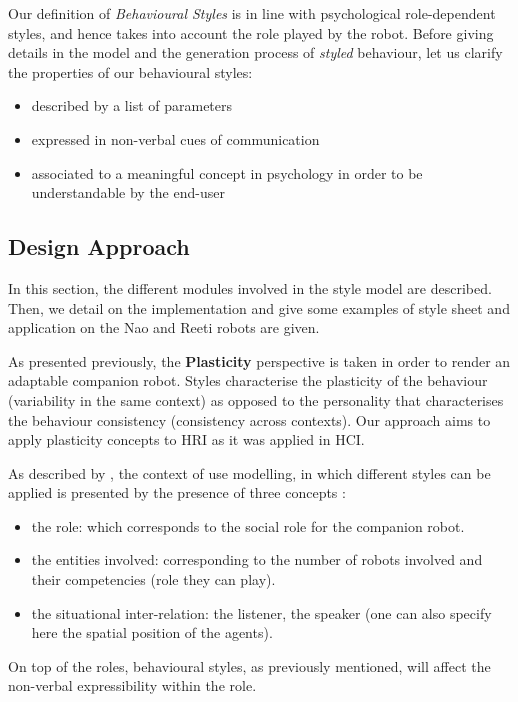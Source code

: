 \documentclass[smallextended]{svjour3}
\begin{document}
Our definition of \emph{Behavioural Styles} is in line with psychological role-dependent styles, and hence takes into account the role played by the robot.
Before giving details in the model and the generation process of \textit{styled} behaviour, let us clarify the properties of our behavioural styles:
\begin{itemize}[noitemsep]
	\item described by a list of parameters
	\item expressed in non-verbal cues of communication
	\item associated to a meaningful concept in psychology in order to be understandable by the end-user
\end{itemize}


\subsection{Design Approach}
In this section, the different modules involved in the style model are described. 
Then, we detail on the implementation and give some examples of style sheet and application on the Nao  and Reeti robots are given.


As presented previously, the \textbf{Plasticity} perspective is taken in order to render an adaptable companion robot.
Styles characterise the plasticity of the behaviour (variability in the same context) as opposed to the personality that characterises the behaviour consistency (consistency across contexts).
Our approach aims to apply plasticity concepts to HRI as it was applied in HCI. 

As described by \cite{Coutaz2012}, the context of use modelling, in which different styles can be applied is presented by the presence of three concepts :
\begin{itemize}[noitemsep,nolistsep]
\item the role: which corresponds to the social role for the companion robot.
\item the entities involved: corresponding to the number of robots involved and their competencies (role they can play).
\item the situational inter-relation: the listener, the speaker (one can also specify here the spatial position of the agents).
\end{itemize}


On top of the roles, behavioural styles, as previously mentioned, will affect the non-verbal expressibility within the role.
\end{document}
